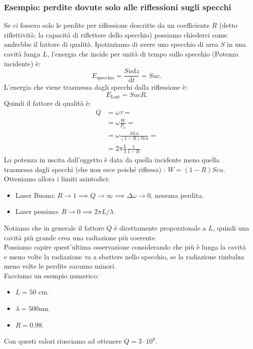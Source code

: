 \subsubsection{Esempio: perdite dovute solo alle riflessioni sugli specchi}%
Se ci fossero solo le perdite per riflessione descritte da un coefficiente $R$ (detto riflettività: la capacità di riflettere dello specchio) possiamo chiederci come andrebbe il fattore di qualità. Ipotizziamo di avere uno specchio di area $S$ in una cavità lunga $L$, l'energia che incide per unità di tempo sullo specchio (Potenza incidente) è:
\[
E_\text{specchio} = \frac{Su\text{d}z}{\text{d}t} = Suc
.\] 
L'energia che viene trasmessa dagli specchi dalla riflessione è:
\[
E_\text{Lost} = SucR
.\] 
Quindi il fattore di qualità è:
\[\begin{aligned}
    Q &= \omega\tau = \\
      &= \omega  \frac{W}{P_u} =\\
      &=\omega\frac{SLu}{\left(1-R\right)Scu} =\\
      &=2\pi \frac{L}{\lambda } \frac{1}{1-R}
.\end{aligned}\]
La potenza in uscita dall'oggetto è data da quella incidente meno quella trasmessa dagli specchi (che non esce poiché riflessa) : $W = \left(1-R\right)Scu$.\\
Otteniamo allora i limiti asintodici:
\begin{itemize}
    \item Laser Buono: $R\to 1 \implies  Q\to \infty \implies  \Delta\omega\to 0$, nessuna perdita.
    \item Laser pessimo: $R\to 0 \implies  2\pi  L /\lambda$.
\end{itemize}
Notiamo che in generale il fattore $Q$ è direttamente proporzionale a $L$, quindi una cavità più grande crea una radiazione più coerente.\\
Possiamo capire quest'ultima osservazione considerando che più è lunga la cavità e meno volte la radiazione va a sbattere nello specchio, se la radiazione rimbalza meno volte le perdite saranno minori.\\
Facciamo un esempio numerico:
\begin{itemize}
    \item $L=50$ cm.
    \item $\lambda = 500$nm.
    \item $R = 0.98$. 
\end{itemize}
Con questi valori riusciamo ad ottenere $Q = 3\cdot 10^8$.\\
